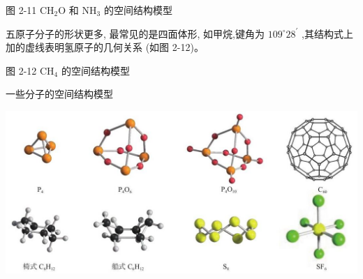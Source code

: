 \documentclass[10pt]{article}
\begin{document}
图 2-11 \({\mathrm{{CH}}}_{2}\mathrm{O}\) 和 \({\mathrm{{NH}}}_{3}\) 的空间结构模型

五原子分子的形状更多, 最常见的是四面体形, 如甲烷,键角为 \({109}^{ \circ }{28}^{\prime }\) ,其结构式上加的虚线表明氢原子的几何关系 (如图 2-12)。

\begin{center}
\end{center}

图 2-12 \({\mathrm{{CH}}}_{4}\) 的空间结构模型

一些分子的空间结构模型

\begin{center}
\includegraphics[max width=1.0\textwidth]{images/0190e026-5a11-7df7-bd27-54d09026ba7a_47_687567.jpg}
\end{center}
\end{document}
